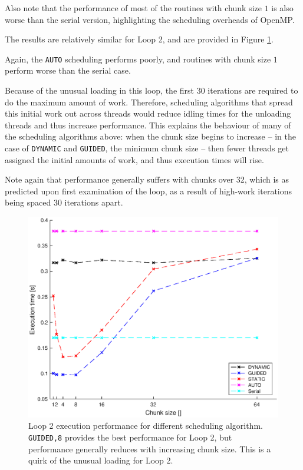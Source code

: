 \documentclass{article} %
\newcommand{\tp}{\texttt}
\begin{document}
Also note that the performance of most of the routines with chunk size $1$ is also worse than the serial version, highlighting the scheduling overheads of OpenMP.

The results are relatively similar for Loop 2, and are provided in Figure \ref{fig:loop2results}. 

Again, the \tp{AUTO} scheduling performs poorly, and routines with chunk size $1$ perform worse than the serial case.

Because of the unusual loading in this loop, the first 30 iterations are required to do the maximum amount of work.
Therefore, scheduling algorithms that spread this initial work out across threads would reduce idling times for the unloading threads and thus increase performance.
This explains the behaviour of many of the scheduling algorithms above: when the chunk size begins to increase -- in the case of \tp{DYNAMIC} and \tp{GUIDED}, the minimum chunk size -- then fewer threads get assigned the initial amounts of work, and thus execution times will rise.

Note again that performance generally suffers with chunks over 32, which is as predicted upon first examination of the loop, as a result of high-work iterations being spaced 30 iterations apart.

\begin{figure}
    \centering
    \includegraphics[height=.35\textheight]{part1_plots/all_part2.eps}
    \caption{Loop 2 execution performance for different scheduling algorithm. \tp{GUIDED,8} provides the best performance for Loop 2, but performance generally reduces with increasing chunk size.
    This is a quirk of the unusual loading for Loop 2.}
    \label{fig:loop2results}
\end{figure}
\end{document}
